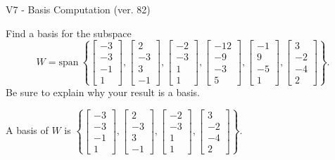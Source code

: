 \begin{exercise}
  \begin{exerciseTitle}V7 - Basis Computation (ver. 82)\end{exerciseTitle}
  \begin{exerciseStatement}
    Find a basis for the subspace 
\[W=\mathrm{span}\ \left\{\left[\begin{array}{r}
-3 \\
-3 \\
-1 \\
1
\end{array}\right] , \left[\begin{array}{r}
2 \\
-3 \\
3 \\
-1
\end{array}\right] , \left[\begin{array}{r}
-2 \\
-3 \\
1 \\
1
\end{array}\right] , \left[\begin{array}{r}
-12 \\
-9 \\
-3 \\
5
\end{array}\right] , \left[\begin{array}{r}
-1 \\
9 \\
-5 \\
1
\end{array}\right] , \left[\begin{array}{r}
3 \\
-2 \\
-4 \\
2
\end{array}\right]\right\}.\]
 Be sure to explain why your result is a basis.


  \end{exerciseStatement}
  \begin{exerciseAnswer}
   A basis of \(W\) is  \(\left\{\left[\begin{array}{r}
-3 \\
-3 \\
-1 \\
1
\end{array}\right] , \left[\begin{array}{r}
2 \\
-3 \\
3 \\
-1
\end{array}\right] , \left[\begin{array}{r}
-2 \\
-3 \\
1 \\
1
\end{array}\right] , \left[\begin{array}{r}
3 \\
-2 \\
-4 \\
2
\end{array}\right]\right\}\).
  


  \end{exerciseAnswer}
\end{exercise}